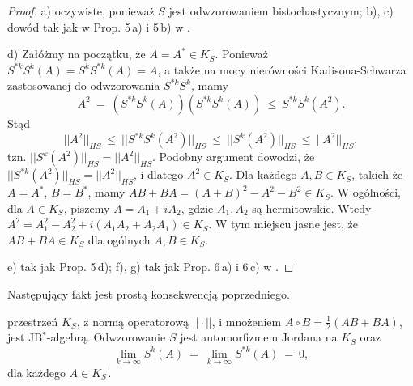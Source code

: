 \begin{proof}
a) oczywiste, ponieważ $S$ jest odwzorowaniem bistochastycznym;
b), c) dowód tak jak w Prop. 5\,a) i 5\,b) w \cite{olkiewicz1999environment}.

d)  Załóżmy na początku, że $A = A^{*} \in K_{S}$.
Ponieważ $S^{*k} S^{k}(A) = S^{k} S^{*k}(A) = A$,
a także na mocy nierówności Kadisona-Schwarza zastosowanej do odwzorowania
$S^{*k} S^{k}$, mamy
\begin{equation}
A^{2} \: = \: \left( S^{*k} S^{k}(A) \right) \left( S^{*k} S^{k}(A) \right)
    \: \leq \: S^{*k} S^{k}(A^{2}).
\end{equation}
Stąd
\begin{equation}
||A^{2}||_{HS} \: \leq \: || S^{*k} S^{k}(A^{2}) ||_{HS} \: \leq \:
    || S^{k}(A^{2}) ||_{HS} \: \leq \: ||A^{2}||_{HS},
\end{equation}
tzn. $|| S^{k}(A^{2}) ||_{HS} = ||A^{2}||_{HS}$.
Podobny argument dowodzi, że
$|| S^{*k}(A^{2}) ||_{HS} = ||A^{2}||_{HS}$,
i dlatego $A^{2} \in K_{S}$.
Dla każdego $A, B \in K_{S}$, takich że $A = A^{*}$, $B = B^{*}$,
mamy
$AB + BA = (A + B)^{2} - A^{2} - B^{2} \in K_{S}$.
W ogólności, dla $A \in K_{S}$, piszemy
$A = A_{1} + i A_{2}$, gdzie $A_{1}, A_{2}$ są hermitowskie.
Wtedy
$A^{2} = A_{1}^{2} - A_{2}^{2} + i(A_{1} A_{2} + A_{2} A_{1}) \in K_{S}$.
W tym miejscu jasne jest, że $AB+BA \in K_{S}$ dla ogólnych $A,B \in K_{S}$.

e) tak jak Prop. 5\,d);
f), g) tak jak Prop. 6\,a) i 6\,c) w
\cite{olkiewicz1999environment}.
\end{proof}

Następujący fakt jest prostą konsekwencją poprzedniego.

\begin{Corollary}
\label{cor:KisJordanAlgebra}
przestrzeń $K_{S}$,
z normą operatorową $|| \cdot ||$,
i mnożeniem  $A \circ B = \frac{1}{2}(AB + BA)$,
jest JB$^{*}$-algebrą.
Odwzorowanie $S$ jest automorfizmem Jordana na $K_{S}$ oraz
\begin{equation}
\label{eq:SGoesTo0OnKOrth}
    \lim \limits_{k\rightarrow \infty} S^{k}(A)  \: = \:
    \lim \limits_{k\rightarrow \infty} S^{*k}(A) \: = \: 0,
\end{equation}
dla każdego $A \in K_{S}^{\perp}$.
\end{Corollary}

